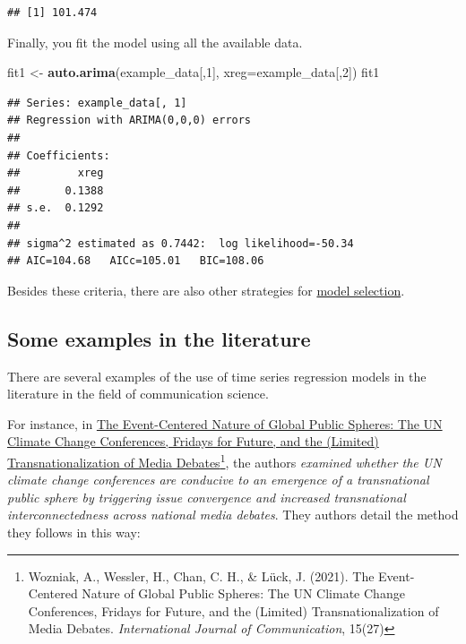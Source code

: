 \documentclass[
]{article}
\newenvironment{Shaded}{\begin{snugshade}}{\end{snugshade}}
\newcommand{\DataTypeTok}[1]{\textcolor[rgb]{0.13,0.29,0.53}{#1}}
\newcommand{\DecValTok}[1]{\textcolor[rgb]{0.00,0.00,0.81}{#1}}
\newcommand{\KeywordTok}[1]{\textcolor[rgb]{0.13,0.29,0.53}{\textbf{#1}}}
\newcommand{\NormalTok}[1]{#1}
\newcommand{\StringTok}[1]{\textcolor[rgb]{0.31,0.60,0.02}{#1}}
\begin{document}
\begin{verbatim}
## [1] 101.474
\end{verbatim}

Finally, you fit the model using all the available data.

\begin{Shaded}
\begin{Highlighting}[]
\NormalTok{fit1 <-}\StringTok{ }\KeywordTok{auto.arima}\NormalTok{(example_data[,}\DecValTok{1}\NormalTok{], }\DataTypeTok{xreg=}\NormalTok{example_data[,}\DecValTok{2}\NormalTok{])}
\NormalTok{fit1}
\end{Highlighting}
\end{Shaded}

\begin{verbatim}
## Series: example_data[, 1] 
## Regression with ARIMA(0,0,0) errors 
## 
## Coefficients:
##         xreg
##       0.1388
## s.e.  0.1292
## 
## sigma^2 estimated as 0.7442:  log likelihood=-50.34
## AIC=104.68   AICc=105.01   BIC=108.06
\end{verbatim}

Besides these criteria, there are also other strategies for \href{https://en.wikipedia.org/wiki/Model_selection}{model selection}.

\hypertarget{some-examples-in-the-literature}{%
\subsection{Some examples in the literature}\label{some-examples-in-the-literature}}

There are several examples of the use of time series regression models in the literature in the field of communication science.

For instance, in \href{https://ijoc.org/index.php/ijoc/article/viewFile/14843/3344}{The Event-Centered Nature of Global Public Spheres: The UN Climate Change Conferences, Fridays for Future, and the (Limited) Transnationalization of Media Debates}\footnote{Wozniak, A., Wessler, H., Chan, C. H., \& Lück, J. (2021). The Event-Centered Nature of Global Public Spheres: The UN Climate Change Conferences, Fridays for Future, and the (Limited) Transnationalization of Media Debates. \emph{International Journal of Communication}, 15(27)}, the authors \emph{examined whether the UN climate change conferences are conducive to an emergence of a transnational public sphere by triggering issue convergence and increased transnational interconnectedness across national media debates}. They authors detail the method they follows in this way:
\end{document}

